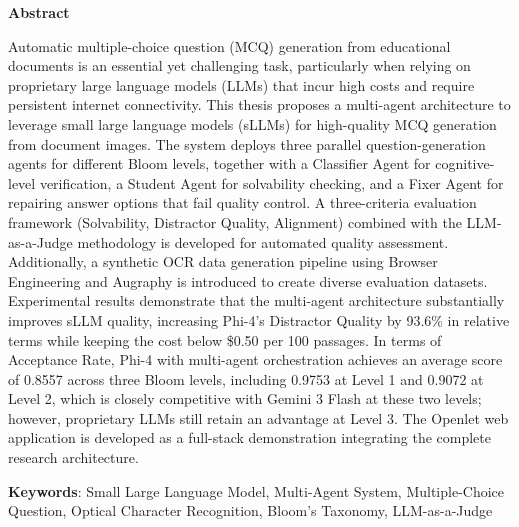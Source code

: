 \begin{center}
\textbf{\large{Abstract}}
\end{center}

\begin{small}

Automatic multiple-choice question (MCQ) generation from educational documents is an essential yet challenging task, particularly when relying on proprietary large language models (LLMs) that incur high costs and require persistent internet connectivity. This thesis proposes a multi-agent architecture to leverage small large language models (sLLMs) for high-quality MCQ generation from document images. The system deploys three parallel question-generation agents for different Bloom levels, together with a Classifier Agent for cognitive-level verification, a Student Agent for solvability checking, and a Fixer Agent for repairing answer options that fail quality control. A three-criteria evaluation framework (Solvability, Distractor Quality, Alignment) combined with the LLM-as-a-Judge methodology is developed for automated quality assessment. Additionally, a synthetic OCR data generation pipeline using Browser Engineering and Augraphy is introduced to create diverse evaluation datasets. Experimental results demonstrate that the multi-agent architecture substantially improves sLLM quality, increasing Phi-4's Distractor Quality by 93.6\% in relative terms while keeping the cost below \$0.50 per 100 passages. In terms of Acceptance Rate, Phi-4 with multi-agent orchestration achieves an average score of 0.8557 across three Bloom levels, including 0.9753 at Level 1 and 0.9072 at Level 2, which is closely competitive with Gemini 3 Flash at these two levels; however, proprietary LLMs still retain an advantage at Level 3. The Openlet web application is developed as a full-stack demonstration integrating the complete research architecture.

\vspace*{1cm}
\textbf{Keywords}: Small Large Language Model, Multi-Agent System, Multiple-Choice Question, Optical Character Recognition, Bloom's Taxonomy, LLM-as-a-Judge

\end{small}
